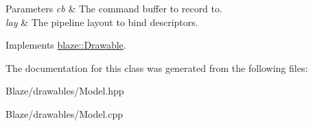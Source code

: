 \begin{DoxyParams}{Parameters}
{\em cb} & The command buffer to record to. \\
\hline
{\em lay} & The pipeline layout to bind descriptors. \\
\hline
\end{DoxyParams}


Implements \hyperlink{classblaze_1_1Drawable_aa2bd171547027319e4254c47e0628163}{blaze\+::\+Drawable}.



The documentation for this class was generated from the following files\+:\begin{DoxyCompactItemize}
\item 
Blaze/drawables/Model.\+hpp\item 
Blaze/drawables/Model.\+cpp\end{DoxyCompactItemize}

